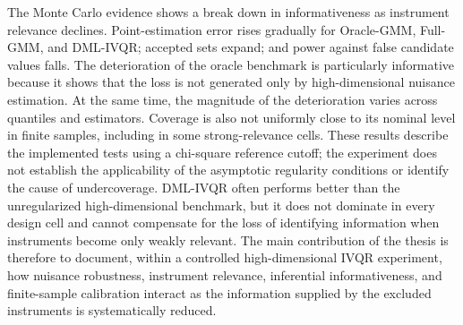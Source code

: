 The Monte Carlo evidence shows a break down in informativeness as instrument relevance declines. Point-estimation error rises gradually for Oracle-GMM, Full-GMM, and DML-IVQR; accepted sets expand; and power against false candidate values falls. The deterioration of the oracle benchmark is particularly informative because it shows that the loss is not generated only by high-dimensional nuisance estimation. At the same time, the magnitude of the deterioration varies across quantiles and estimators. Coverage is also not uniformly close to its nominal level in finite samples, including in some strong-relevance cells. These results describe the implemented tests using a chi-square reference cutoff; the experiment does not establish the applicability of the asymptotic regularity conditions or identify the cause of undercoverage. DML-IVQR often performs better than the unregularized high-dimensional benchmark, but it does not dominate in every design cell and cannot compensate for the loss of identifying information when instruments become only weakly relevant. The main contribution of the thesis is therefore to document, within a controlled high-dimensional IVQR experiment, how nuisance robustness, instrument relevance, inferential informativeness, and finite-sample calibration interact as the information supplied by the excluded instruments is systematically reduced.
